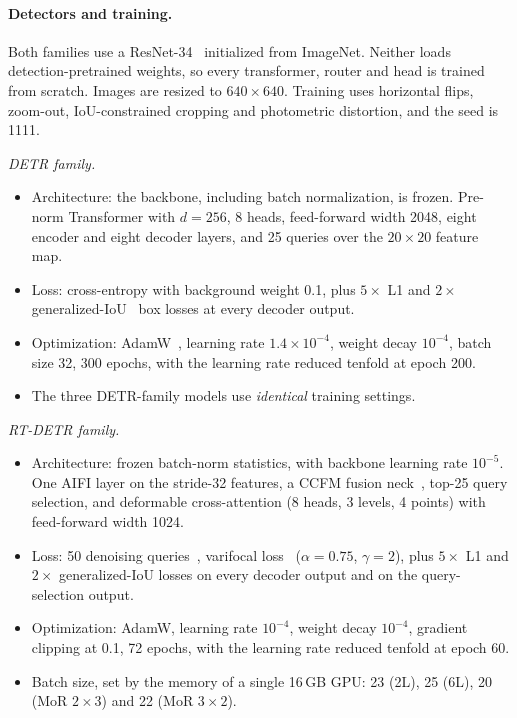 \documentclass[pdflatex,iicol,sn-basic,Numbered]{sn-jnl}
\newcommand{\x}{\ensuremath{\times}}
\begin{document}
\paragraph{Detectors and training.}
Both families use a ResNet-34~\cite{he2016resnet} initialized from ImageNet. Neither loads detection-pretrained weights, so every transformer, router and head is trained from scratch. Images are resized to $640\times640$. Training uses horizontal flips, zoom-out, IoU-constrained cropping and photometric distortion, and the seed is 1111.

\emph{DETR family.}
\begin{itemize}
\item Architecture: the backbone, including batch normalization, is frozen. Pre-norm Transformer with $d=256$, 8 heads, feed-forward width 2048, eight encoder and eight decoder layers, and 25 queries over the $20\times20$ feature map.
\item Loss: cross-entropy with background weight 0.1, plus $5\times$ L1 and $2\times$ generalized-IoU~\cite{rezatofighi2019giou} box losses at every decoder output.
\item Optimization: AdamW~\cite{loshchilov2019adamw}, learning rate $1.4\times10^{-4}$, weight decay $10^{-4}$, batch size 32, 300 epochs, with the learning rate reduced tenfold at epoch 200.
\item The three DETR-family models use \emph{identical} training settings.
\end{itemize}

\emph{RT-DETR family.}
\begin{itemize}
\item Architecture: frozen batch-norm statistics, with backbone learning rate $10^{-5}$. One AIFI layer on the stride-32 features, a CCFM fusion neck~\cite{zhao2024rtdetr}, top-25 query selection, and deformable cross-attention (8 heads, 3 levels, 4 points) with feed-forward width 1024.
\item Loss: 50 denoising queries~\cite{li2022dn}, varifocal loss~\cite{zhang2021varifocal} ($\alpha=0.75$, $\gamma=2$), plus $5\times$ L1 and $2\times$ generalized-IoU losses on every decoder output and on the query-selection output.
\item Optimization: AdamW, learning rate $10^{-4}$, weight decay $10^{-4}$, gradient clipping at 0.1, 72 epochs, with the learning rate reduced tenfold at epoch 60.
\item Batch size, set by the memory of a single 16\,GB GPU: 23 (2L), 25 (6L), 20 (MoR $2\x3$) and 22 (MoR $3\x2$).
\end{itemize}
\end{document}
